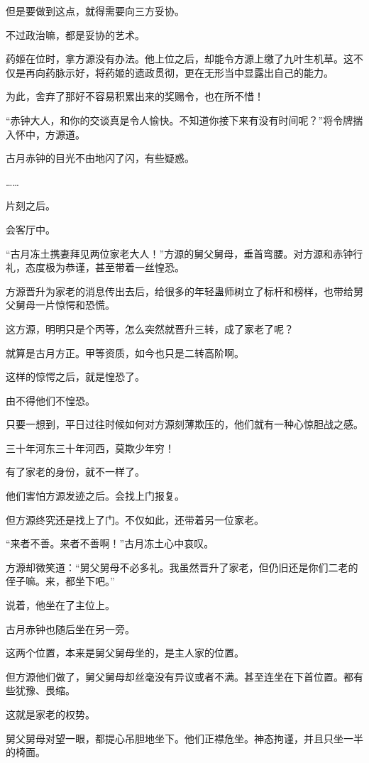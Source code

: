 \begin{this_body}
但是要做到这点，就得需要向三方妥协。

不过政治嘛，都是妥协的艺术。

药姬在位时，拿方源没有办法。他上位之后，却能令方源上缴了九叶生机草。这不仅是再向药脉示好，将药姬的遗政贯彻，更在无形当中显露出自己的能力。

为此，舍弃了那好不容易积累出来的奖赐令，也在所不惜！

“赤钟大人，和你的交谈真是令人愉快。不知道你接下来有没有时间呢？”将令牌揣入怀中，方源道。

古月赤钟的目光不由地闪了闪，有些疑惑。

……

片刻之后。

会客厅中。

“古月冻土携妻拜见两位家老大人！”方源的舅父舅母，垂首弯腰。对方源和赤钟行礼，态度极为恭谨，甚至带着一丝惶恐。

方源晋升为家老的消息传出去后，给很多的年轻蛊师树立了标杆和榜样，也带给舅父舅母一片惊愕和恐慌。

这方源，明明只是个丙等，怎么突然就晋升三转，成了家老了呢？

就算是古月方正。甲等资质，如今也只是二转高阶啊。

这样的惊愕之后，就是惶恐了。

由不得他们不惶恐。

只要一想到，平日过往时候如何对方源刻薄欺压的，他们就有一种心惊胆战之感。

三十年河东三十年河西，莫欺少年穷！

有了家老的身份，就不一样了。

他们害怕方源发迹之后。会找上门报复。

但方源终究还是找上了门。不仅如此，还带着另一位家老。

“来者不善。来者不善啊！”古月冻土心中哀叹。

方源却微笑道：“舅父舅母不必多礼。我虽然晋升了家老，但仍旧还是你们二老的侄子嘛。来，都坐下吧。”

说着，他坐在了主位上。

古月赤钟也随后坐在另一旁。

这两个位置，本来是舅父舅母坐的，是主人家的位置。

但方源他们做了，舅父舅母却丝毫没有异议或者不满。甚至连坐在下首位置。都有些犹豫、畏缩。

这就是家老的权势。

舅父舅母对望一眼，都提心吊胆地坐下。他们正襟危坐。神态拘谨，并且只坐一半的椅面。


\end{this_body}
